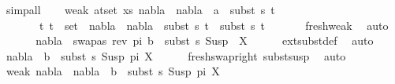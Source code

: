 \begin{isabellebody}
\ simp{\isacharunderscore}{\kern0pt}all\isanewline
\ \ \isamarkupfalse%
\ weak{}{\isacharcolon}{\kern0pt}\ {\isachardoublequoteopen}{\isasymforall}{\isacharparenleft}{\kern0pt}a{\isacharcomma}{\kern0pt}t{\isacharparenright}{\kern0pt}{\isasymin}set\ xs{\isachardot}{\kern0pt}\ {\isacharparenleft}{\kern0pt}nabla{}\ {\isasymunion}\ nabla{}{\isacharparenright}{\kern0pt}\ {\isasymturnstile}\ a\ {\isasymsharp}\ subst\ s{}\ t{\isachardoublequoteclose}\isanewline
\ \ \ \ \ \ {\isachardoublequoteopen}{\isasymforall}\ {\isacharparenleft}{\kern0pt}t{}{\isacharcomma}{\kern0pt}\ t{}{\isacharparenright}{\kern0pt}\ {\isasymin}\ set\ {\isacharbrackleft}{\kern0pt}{\isacharbrackright}{\kern0pt}{\isachardot}{\kern0pt}\ {\isacharparenleft}{\kern0pt}nabla{}\ {\isasymunion}\ nabla{}{\isacharparenright}{\kern0pt}\ {\isasymturnstile}\ subst\ s{}\ t{}\ {\isasymapprox}\ subst\ s{}\ t{}{\isachardoublequoteclose}\isanewline
\ \ \ \ \ \isamarkupfalse%
\ fresh{\isacharunderscore}{\kern0pt}weak\ \isamarkupfalse%
\ auto\isanewline
\ \ \isamarkupfalse%
\ {}\ \isamarkupfalse%
\ {\isachardoublequoteopen}nabla{}\ {\isasymturnstile}\ swapas\ {\isacharparenleft}{\kern0pt}rev\ pi{\isacharparenright}{\kern0pt}\ b\ {\isasymsharp}\ subst\ s{}\ {\isacharparenleft}{\kern0pt}Susp\ {\isacharbrackleft}{\kern0pt}{\isacharbrackright}{\kern0pt}\ X{\isacharparenright}{\kern0pt}{\isachardoublequoteclose}\isanewline
\ \ \ \ \isamarkupfalse%
\ ext{\isacharunderscore}{\kern0pt}subst{\isacharunderscore}{\kern0pt}def\ \isamarkupfalse%
\ auto\isanewline
\ \ \isamarkupfalse%
\ {\isachardoublequoteopen}nabla{}\ {\isasymturnstile}\ b\ {\isasymsharp}\ subst\ s{}\ {\isacharparenleft}{\kern0pt}Susp\ pi\ X{\isacharparenright}{\kern0pt}{\isachardoublequoteclose}\isanewline
\ \ \ \ \isamarkupfalse%
\ fresh{\isacharunderscore}{\kern0pt}swap{\isacharunderscore}{\kern0pt}right\ subst{\isacharunderscore}{\kern0pt}susp\ \isamarkupfalse%
\ auto\isanewline
\ \ \isamarkupfalse%
\ weak{}{\isacharcolon}{\kern0pt}\ {\isachardoublequoteopen}{\isacharparenleft}{\kern0pt}nabla{}\ {\isasymunion}\ nabla{}{\isacharparenright}{\kern0pt}\ {\isasymturnstile}\ b\ {\isasymsharp}\ subst\ s{}\ {\isacharparenleft}{\kern0pt}Susp\ pi\ X{\isacharparenright}{\kern0pt}{\isachardoublequoteclose}\isanewline

\end{isabellebody}
